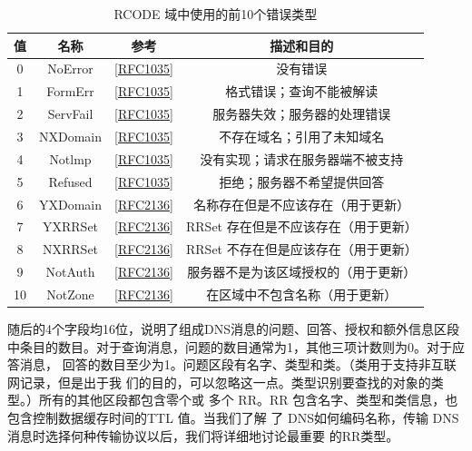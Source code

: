 \begin{table}[]
	\centering
	\caption{RCODE 域中使用的前10个错误类型}
	\begin{tabular}{c|c|c|c}
		\hline
        值	&	名称	&	参考	&	描述和目的  \\ \hline
        0	&	NoError	&	\href{https://www.rfc-editor.org/rfc/rfc1035}{[RFC1035]}	&	没有错误    \\ \hline
        1	&	FormErr	&	\href{https://www.rfc-editor.org/rfc/rfc1035}{[RFC1035]}	&	格式错误；查询不能被解读    \\ \hline
        2	&	ServFail	&	\href{https://www.rfc-editor.org/rfc/rfc1035}{[RFC1035]}	&	服务器失效；服务器的处理错误    \\ \hline
        3	&	NXDomain	&	\href{https://www.rfc-editor.org/rfc/rfc1035}{[RFC1035]}	&	不存在域名；引用了未知域名  \\ \hline
        4	&	Notlmp	&	\href{https://www.rfc-editor.org/rfc/rfc1035}{[RFC1035]}	&	没有实现；请求在服务器端不被支持    \\ \hline
        5	&	Refused	&	\href{https://www.rfc-editor.org/rfc/rfc1035}{[RFC1035]}	&	拒绝；服务器不希望提供回答  \\ \hline
        6	&	YXDomain	&	\href{https://www.rfc-editor.org/rfc/rfc2136}{[RFC2136]}	&	名称存在但是不应该存在（用于更新）  \\ \hline
        7	&	YXRRSet	&	\href{https://www.rfc-editor.org/rfc/rfc2136}{[RFC2136]}	&	RRSet 存在但是不应该存在（用于更新）    \\ \hline
        8	&	NXRRSet	&	\href{https://www.rfc-editor.org/rfc/rfc2136}{[RFC2136]}	&	RRSet 不存在但是应该存在（用于更新）    \\ \hline
        9	&	NotAuth	&	\href{https://www.rfc-editor.org/rfc/rfc2136}{[RFC2136]}	&	服务器不是为该区域授权的（用于更新）    \\ \hline
        10	&	NotZone	&	\href{https://www.rfc-editor.org/rfc/rfc2136}{[RFC2136]}	&	在区域中不包含名称（用于更新）  \\ \hline
	\end{tabular}
\end{table}

随后的4个字段均16位，说明了组成DNS消息的问题、回答、授权和额外信息区段
中条目的数目。对于查询消息，问题的数目通常为1，其他三项计数则为0。对于应答消息，
回答的数目至少为1。问题区段有名字、类型和类。（类用于支持非互联网记录，但是出于我
们的目的，可以忽略这一点。类型识别要查找的对象的类型。）所有的其他区段都包含零个或
多个 RR。RR 包含名字、类型和类信息，也包含控制数据缓存时间的TTL 值。当我们了解
了 DNS如何编码名称，传输 DNS 消息时选择何种传输协议以后，我们将详细地讨论最重要
的RR类型。

